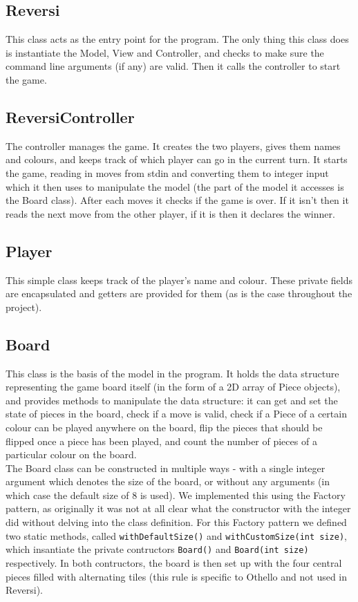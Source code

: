 \documentclass[11pt,a4paper,oneside]{report}
\begin{document}
\subsection*{Reversi}
This class acts as the entry point for the program. The only thing this class does is instantiate the Model, View and Controller, and checks to make sure the command line arguments (if any) are valid. Then it calls the controller to start the game.

\subsection*{ReversiController}
The controller manages the game. It creates the two players, gives them names and colours, and keeps track of which player can go in the current turn. It starts the game, reading in moves from stdin and converting them to integer input which it then uses to manipulate the model (the part of the model it accesses is the Board class). After each moves it checks if the game is over. If it isn't then it reads the next move from the other player, if it is then it declares the winner.

\subsection*{Player}
This simple class keeps track of the player's name and colour. These private fields are encapsulated and getters are provided for them (as is the case throughout the project).

\subsection*{Board}
This class is the basis of the model in the program. It holds the data structure representing the game board itself (in the form of a 2D array of Piece objects), and provides methods to manipulate the data structure: it can get and set the state of pieces in the board, check if a move is valid, check if a Piece of a certain colour can be played anywhere on the board, flip the pieces that should be flipped once a piece has been played, and count the number of pieces of a particular colour on the board.\\
\indent The Board class can be constructed in multiple ways - with a single integer argument which denotes the size of the board, or without any arguments (in which case the default size of 8 is used). We implemented this using the Factory pattern, as originally it was not at all clear what the constructor with the integer did without delving into the class definition. For this Factory pattern we defined two static methods, called \texttt{withDefaultSize()} and \texttt{withCustomSize(int size)}, which insantiate the private contructors \texttt{Board()} and \texttt{Board(int size)} respectively. In both contructors, the board is then set up with the four central pieces filled with alternating tiles (this rule is specific to Othello and not used in Reversi). 
\end{document}
